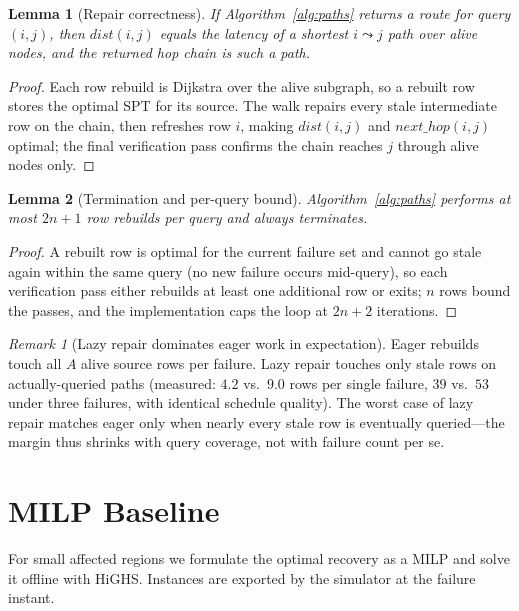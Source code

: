 \documentclass[conference]{IEEEtran}
\newtheorem{lemma}{Lemma}
\theoremstyle{remark}
\newtheorem{remark}{Remark}
\begin{document}
\begin{lemma}[Repair correctness]
\label{lem:correct}
If Algorithm~\ref{alg:paths} returns a route for query $(i,j)$, then
$\mathit{dist}(i,j)$ equals the latency of a shortest $i \leadsto j$ path
over alive nodes, and the returned hop chain is such a path.
\end{lemma}
\begin{proof}
Each row rebuild is Dijkstra over the alive subgraph, so a rebuilt row
stores the optimal SPT for its source. The walk repairs every stale
intermediate row on the chain, then refreshes row $i$, making
$\mathit{dist}(i,j)$ and $\mathit{next\_hop}(i,j)$ optimal; the final
verification pass confirms the chain reaches $j$ through alive nodes only.
\end{proof}

\begin{lemma}[Termination and per-query bound]
\label{lem:term}
Algorithm~\ref{alg:paths} performs at most $2n{+}1$ row rebuilds per query
and always terminates.
\end{lemma}
\begin{proof}
A rebuilt row is optimal for the current failure set and cannot go stale
again within the same query (no new failure occurs mid-query), so each
verification pass either rebuilds at least one additional row or exits;
$n$ rows bound the passes, and the implementation caps the loop at
$2n{+}2$ iterations.
\end{proof}

\begin{remark}[Lazy repair dominates eager work in expectation]
Eager rebuilds touch all $A$ alive source rows per failure. Lazy repair
touches only stale rows on actually-queried paths (measured: $4.2$ vs.\
$9.0$ rows per single failure, $39$ vs.\ $53$ under three failures, with
identical schedule quality). The worst case of lazy repair matches eager
only when nearly every stale row is eventually queried---the margin thus
shrinks with query coverage, not with failure count per se.
\end{remark}

\section{MILP Baseline}
\label{sec:milp}

For small affected regions we formulate the optimal recovery as a MILP and
solve it offline with HiGHS. Instances are exported by the simulator at the
failure instant.
\end{document}
